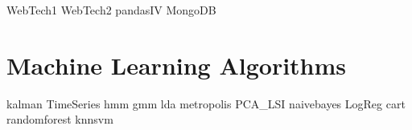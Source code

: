 \documentclass[nociteref]{SIAM-GH-book}
\begin{document}
{WebTech1}
{WebTech2}
{pandasIV}
{MongoDB}

\part{Machine Learning Algorithms}
{kalman}
{TimeSeries}
{hmm}
{gmm}
{lda}
{metropolis}
{PCA_LSI}
{naivebayes}
{LogReg}
{cart}
{randomforest}
{knnsvm}
\end{document}
